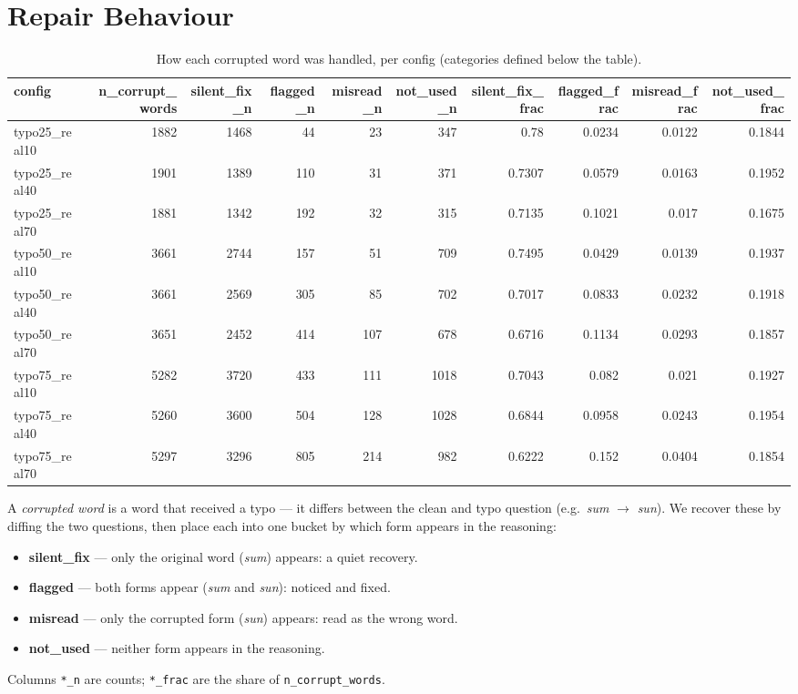 \documentclass[11pt]{article}
\begin{document}
\section*{Repair Behaviour}
\begin{table}[H]
\centering
\caption{How each corrupted word was handled, per config (categories defined below the table).}
\small
\begin{adjustbox}{max width=\textwidth}
\begin{tabular}{lrrrrrrrrr}
\toprule
\textbf{config} & \textbf{n\_corrupt\_words} & \textbf{silent\_fix\_n} & \textbf{flagged\_n} & \textbf{misread\_n} & \textbf{not\_used\_n} & \textbf{silent\_fix\_frac} & \textbf{flagged\_frac} & \textbf{misread\_frac} & \textbf{not\_used\_frac} \\
\midrule
typo25\_real10 & 1882 & 1468 & 44 & 23 & 347 & 0.78 & 0.0234 & 0.0122 & 0.1844 \\
typo25\_real40 & 1901 & 1389 & 110 & 31 & 371 & 0.7307 & 0.0579 & 0.0163 & 0.1952 \\
typo25\_real70 & 1881 & 1342 & 192 & 32 & 315 & 0.7135 & 0.1021 & 0.017 & 0.1675 \\
typo50\_real10 & 3661 & 2744 & 157 & 51 & 709 & 0.7495 & 0.0429 & 0.0139 & 0.1937 \\
typo50\_real40 & 3661 & 2569 & 305 & 85 & 702 & 0.7017 & 0.0833 & 0.0232 & 0.1918 \\
typo50\_real70 & 3651 & 2452 & 414 & 107 & 678 & 0.6716 & 0.1134 & 0.0293 & 0.1857 \\
typo75\_real10 & 5282 & 3720 & 433 & 111 & 1018 & 0.7043 & 0.082 & 0.021 & 0.1927 \\
typo75\_real40 & 5260 & 3600 & 504 & 128 & 1028 & 0.6844 & 0.0958 & 0.0243 & 0.1954 \\
typo75\_real70 & 5297 & 3296 & 805 & 214 & 982 & 0.6222 & 0.152 & 0.0404 & 0.1854 \\
\bottomrule
\end{tabular}
\end{adjustbox}
\end{table}

\noindent A \emph{corrupted word} is a word that received a
typo --- it differs between the clean and typo question (e.g.\ \emph{sum} $\to$
\emph{sun}). We recover these by diffing the two questions, then place each into one
bucket by which form appears in the reasoning:
\begin{itemize}\setlength{\itemsep}{1pt}
  \item \textbf{silent\_fix} --- only the original word (\emph{sum}) appears: a quiet recovery.
  \item \textbf{flagged} --- both forms appear (\emph{sum} and \emph{sun}): noticed and fixed.
  \item \textbf{misread} --- only the corrupted form (\emph{sun}) appears: read as the wrong word.
  \item \textbf{not\_used} --- neither form appears in the reasoning.
\end{itemize}
\noindent Columns \texttt{*\_n} are counts; \texttt{*\_frac} are the share of
\texttt{n\_corrupt\_words}.
\medskip
\end{document}
